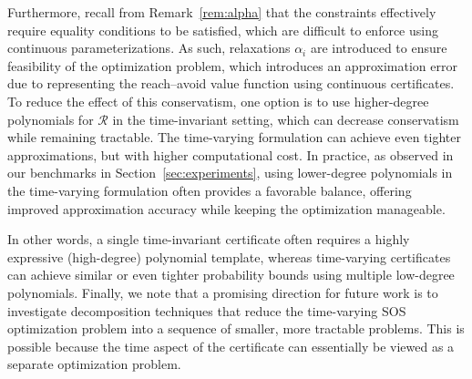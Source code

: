 \documentclass[journal,twoside,web]{ieeecolor}
\newcommand{\ml}[1]{{\color{blue}[ML: #1]}}
\newcommand{\RA}{\mathcal{R}}
\theoremstyle{definition}
\theoremstyle{plain}
\theoremstyle{plain}
\begin{document}
Furthermore, recall from Remark~\ref{rem:alpha} that the constraints effectively require equality conditions to be satisfied, which are difficult to enforce using continuous parameterizations. As such, relaxations $\alpha_i$ are introduced to ensure feasibility of the optimization problem, which introduces an approximation error due to representing the reach–avoid value function using continuous certificates. 
To reduce the effect of this conservatism, one option is to use higher-degree polynomials for $\RA$ in the time-invariant setting, which can decrease conservatism while remaining tractable. 
The time-varying formulation can achieve even tighter approximations, but with higher computational cost. 
In practice, as observed in our benchmarks in Section~\ref{sec:experiments},
using lower-degree polynomials in the time-varying formulation often provides a favorable balance, offering improved approximation accuracy while keeping the optimization manageable.  

In other words, a single time-invariant certificate often requires a highly expressive (high-degree) polynomial template, whereas time-varying certificates can achieve similar or even tighter probability bounds using multiple low-degree polynomials.  Finally, we note that a promising direction for future work is to investigate decomposition techniques that reduce the time-varying SOS optimization problem into a sequence of smaller, more tractable problems.  This is possible because the time aspect of the certificate can essentially be viewed as a separate optimization problem.

\end{document}
